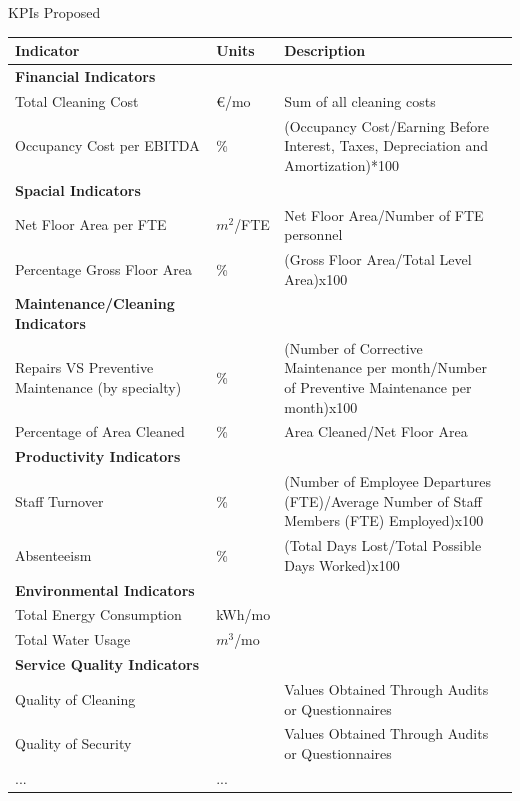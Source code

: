 \begin{frame}{KPIs Proposed}
	\vspace{-0.5cm}
	\resizebox{10cm}{!} {
	\begin{tabular}{llp{7cm}l}
		\hline
		 {\bf Indicator} &  {\bf Units} & {\bf Description} \\
		\hline
		{\bf Financial Indicators} & & \\
		Total Cleaning Cost 				& \euro/mo &  Sum of all cleaning costs \\
		Occupancy Cost per EBITDA & \% & (Occupancy Cost/Earning Before Interest, Taxes, Depreciation and Amortization)*100\\
		\hline

		{\bf Spacial Indicators} & & \\
		Net Floor Area per FTE				& $m^2$/FTE & Net Floor Area/Number of FTE personnel \\
		Percentage Gross Floor Area 		& \% & (Gross Floor Area/Total Level Area)x100 \\
		\hline
		{\bf Maintenance/Cleaning Indicators} & &  \\
		Repairs VS Preventive Maintenance (by specialty)						& \% & (Number of Corrective Maintenance per month/Number of Preventive Maintenance per month)x100 \\
		Percentage of Area Cleaned 												& \% & Area Cleaned/Net Floor Area \\
		\hline
		{\bf Productivity Indicators} & & \\
		Staff Turnover 	 			& \% & (Number of Employee Departures (FTE)/Average Number of Staff Members (FTE) Employed)x100\\
		Absenteeism  				& \% & (Total Days Lost/Total Possible Days Worked)x100 \\
		\hline

		{\bf Environmental Indicators} & & \\
		Total Energy Consumption	 		& kWh/mo & \\
		Total Water Usage					& $m^3$/mo & \\
		\hline
		 {\bf Service Quality Indicators} &  &  \\ 
		Quality of Cleaning							&  & Values Obtained Through Audits or Questionnaires \\
		Quality of Security 						&  & Values Obtained Through Audits or Questionnaires \\
		\hline
		... & ... & \\
	\end{tabular}
	}

\end{frame}
